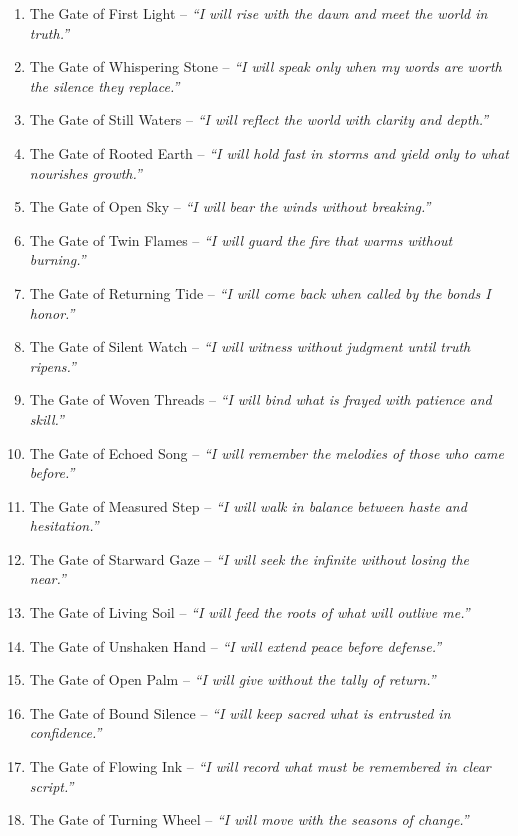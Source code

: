 \begin{enumerate}[label=\textbf{Gate \arabic*:}, leftmargin=3em]

\item The Gate of First Light – \textit{“I will rise with the dawn and meet the world in truth.”}
\item The Gate of Whispering Stone – \textit{“I will speak only when my words are worth the silence they replace.”}
\item The Gate of Still Waters – \textit{“I will reflect the world with clarity and depth.”}
\item The Gate of Rooted Earth – \textit{“I will hold fast in storms and yield only to what nourishes growth.”}
\item The Gate of Open Sky – \textit{“I will bear the winds without breaking.”}
\item The Gate of Twin Flames – \textit{“I will guard the fire that warms without burning.”}
\item The Gate of Returning Tide – \textit{“I will come back when called by the bonds I honor.”}
\item The Gate of Silent Watch – \textit{“I will witness without judgment until truth ripens.”}
\item The Gate of Woven Threads – \textit{“I will bind what is frayed with patience and skill.”}
\item The Gate of Echoed Song – \textit{“I will remember the melodies of those who came before.”}
\item The Gate of Measured Step – \textit{“I will walk in balance between haste and hesitation.”}
\item The Gate of Starward Gaze – \textit{“I will seek the infinite without losing the near.”}
\item The Gate of Living Soil – \textit{“I will feed the roots of what will outlive me.”}
\item The Gate of Unshaken Hand – \textit{“I will extend peace before defense.”}
\item The Gate of Open Palm – \textit{“I will give without the tally of return.”}
\item The Gate of Bound Silence – \textit{“I will keep sacred what is entrusted in confidence.”}
\item The Gate of Flowing Ink – \textit{“I will record what must be remembered in clear script.”}
\item The Gate of Turning Wheel – \textit{“I will move with the seasons of change.”}

\end{enumerate}

